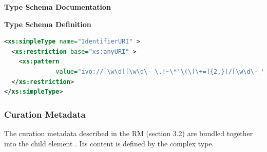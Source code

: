 \documentclass[11pt,a4paper]{ivoa}
\begin{document}

\begin{generated}
\begingroup
      	\renewcommand*\descriptionlabel[1]{%
      	\hbox to 5.5em{\emph{#1}\hfil}}\vspace{2ex}\noindent\textbf{ Type Schema Documentation}


\vspace{1ex}\noindent\textbf{ Type Schema Definition}

\begin{lstlisting}[language=XML,basicstyle=\footnotesize]
<xs:simpleType name="IdentifierURI" >
  <xs:restriction base="xs:anyURI" >
    <xs:pattern
              value="ivo://[\w\d][\w\d\-_\.!~\*'\(\)\+=]{2,}(/[\w\d\-_\.!~\*'\(\)\+=]+(/[\w\d\-_\.!~\*'\(\)\+=]+)*)?" />
  </xs:restriction>
</xs:simpleType>
\end{lstlisting}\endgroup
\end{generated}




\subsubsection{Curation Metadata}


The curation metadata described in the RM (section
3.2) are bundled together into the  child element
.  Its content is defined by the
 complex type.
\end{document}
